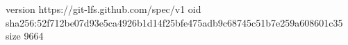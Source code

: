 version https://git-lfs.github.com/spec/v1
oid sha256:52f712be07d93e5ca4926b1d14f25bfe475adb9c68745c51b7e259a608601c35
size 9664
